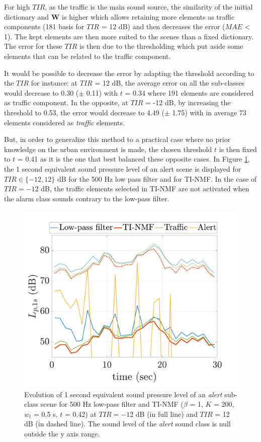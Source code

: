 \documentclass[twocolumn]{svjour3}          %
\begin{document}
For high $TIR$, as the traffic is the main sound source, the similarity of the initial dictionary and $\mathbf{W}$ is higher which allows retaining more elements as traffic components (181 basis for $TIR$ = 12 dB) and then decreases the error ($MAE$ < 1). The kept elements are then more suited to the scenes than a fixed dictionary. The error for these $TIR$ is then due to the thresholding which put aside some elements that can be related to the traffic component. 

It would be possible to decrease the error by adapting the threshold according to the $TIR$ for instance: at $TIR$ = 12 dB, the average error on all the sub-classes would decrease to 0.30 ($\pm$ 0.11) with $t$ = 0.34 where 191 elements are considered as traffic component. In the opposite, at $TIR$ = -12 dB, by increasing the threshold to 0.53, the error would decrease to 4.49 ($\pm$ 1.75) with in average 73 elements considered as \textit{traffic} elements.

But, in order to generalize this method to a practical case where no prior knowledge on the urban environment is made, the chosen threshold $t$ is then fixed to $t$ = 0.41 as it is the one that best balanced these opposite cases.
In Figure \ref{fig:lp_alert}, the 1 second equivalent sound pressure level of an alert scene is displayed for $TIR \in \lbrace -12,12 \rbrace$ dB for the 500 Hz low pass filter and for TI-NMF. In the case of $TIR=-12$ dB, the traffic elements selected in TI-NMF are not activated when the alarm class sounds contrary to the low-pass filter.

\begin{figure}[t]
  \centering
	\includegraphics[width=\textwidth]{figures/NMF_Lp_alert.pdf}
 \caption{Evolution of 1 second equivalent sound pressure level of an \textit{alert} sub-class scene for 500 Hz low-pass filter and TI-NMF ($\beta$ = 1, $K$ = 200, $w_t$ = 0.5 s, $t$ = 0.42) at $TIR = -12$ dB (in full line) and $TIR$ = 12 dB (in dashed line). The sound level of the \textit{alert} sound class is null outside the y axis range.}
	\label{fig:lp_alert}
\end{figure}
\end{document}
